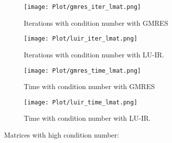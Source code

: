 \begin{figure}[ht]
     \begin{minipage}[b]{0.5\linewidth}
        \centering
   \texttt{[image: Plot/gmres\_iter\_lmat.png]}
        \caption{Iterations with condition number with GMRES}
        \label{fig:image9}
    \end{minipage}
    \hspace{0.5cm} 
    \begin{minipage}[b]{0.5\linewidth}
        \centering
        \texttt{[image: Plot/luir\_iter\_lmat.png]}
        \caption{Iterations with condition number with LU-IR.}
        \label{fig:image10}
    \end{minipage}
\end{figure}
\newpage
\begin{figure}[ht]
     \begin{minipage}[b]{0.5\linewidth}
        \centering
   \texttt{[image: Plot/gmres\_time\_lmat.png]}
        \caption{Time with condition number with GMRES}
        \label{fig:image11}
    \end{minipage}
    \hspace{0.5cm} 
    \begin{minipage}[b]{0.5\linewidth}
        \centering
        \texttt{[image: Plot/luir\_time\_lmat.png]}
        \caption{Time with condition number with LU-IR.}
        \label{fig:image12}
    \end{minipage}
\end{figure}
\clearpage
\newpage
Matrices with high condition number:
